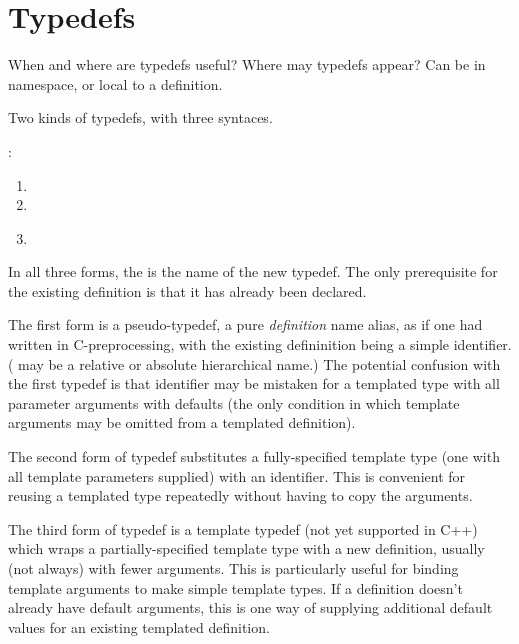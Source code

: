 

\chapter{Typedefs}
\label{sec:typedefs}

When and where are typedefs useful?  
Where may typedefs appear?
Can be in namespace, or local to a definition.  

Two kinds of typedefs, with three syntaces.  

\medskip
\noindent
{}:
\begin{enumerate}
\item {}  \ttt{;}
\item {}  
	\ttt{<}  \ttt{>} \ttt{;}
\item {}\\
	  
	\ttt{<}  \ttt{>} \ttt{;}
\end{enumerate}

In all three forms, 
the  is the name of the new typedef.  
The only prerequisite for the existing definition is that it has already 
been declared.  

The first form is a pseudo-typedef, a pure \emph{definition} name alias, 
as if one had written 
   
in C-preprocessing, 
with the existing defininition being a simple identifier.  
( may be a relative or absolute hierarchical name.) 
The potential confusion with the first typedef is that 
 identifier may be mistaken for a templated type
with all parameter arguments with defaults 
(the only condition in which template arguments 
may be omitted from a templated definition).  

The second form of typedef substitutes a fully-specified template type
(one with all template parameters supplied) with an identifier.  
This is convenient for reusing a templated type repeatedly without
having to copy the arguments.  

The third form of typedef is a template typedef (not yet supported in C++)
which wraps a partially-specified template type with a new definition, 
usually (not always) with fewer arguments.  
This is particularly useful for binding template arguments
to make simple template types.  
If a definition doesn't already have default arguments, 
this is one way of supplying additional default values 
for an existing templated definition.  

